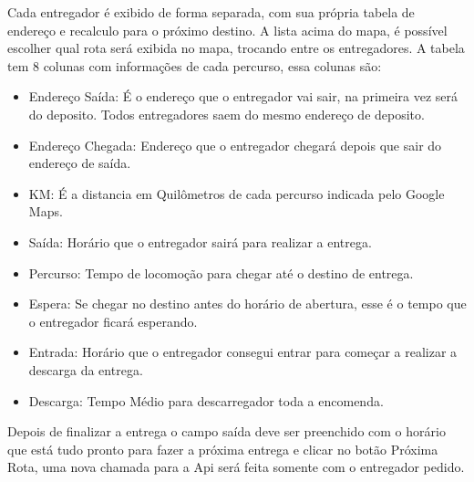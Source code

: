 \begin{center}
	\label{fig:InterfaceResultado}
\end{center}

Cada entregador é exibido de forma separada, com sua própria tabela de endereço e recalculo para o próximo destino. A lista acima do mapa, é possível escolher qual rota será exibida no mapa, trocando entre os entregadores.
A tabela tem 8 colunas com informações de cada percurso, essa colunas são:
\begin{itemize}
	\item Endereço Saída: É o endereço que o entregador vai sair, na primeira vez será do deposito. Todos entregadores saem do mesmo endereço de deposito.
	\item Endereço Chegada: Endereço que o entregador chegará depois que sair do endereço de saída.
	\item KM: É a distancia em Quilômetros de cada percurso indicada pelo Google Maps.
	\item Saída: Horário que o entregador sairá para realizar a entrega.
	\item Percurso: Tempo de locomoção para chegar até o destino de entrega.
	\item Espera: Se chegar no destino antes do horário de abertura, esse é o tempo que o entregador ficará esperando.
	\item Entrada: Horário que o entregador consegui entrar para começar a realizar a descarga da entrega.
	\item Descarga: Tempo Médio para descarregador toda a encomenda.
\end{itemize}
Depois de finalizar a entrega o campo saída deve ser preenchido com o horário que está tudo pronto para fazer a próxima entrega e clicar no botão Próxima Rota, uma nova chamada para a Api será feita somente com o entregador pedido.
